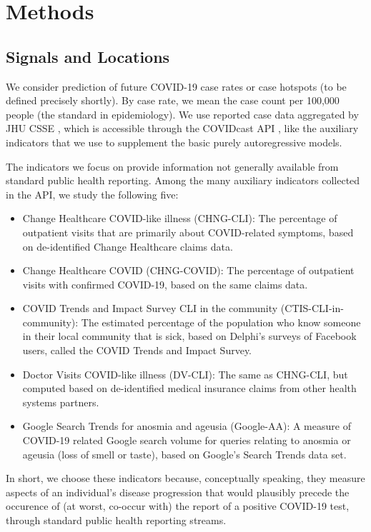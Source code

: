 \documentclass[9pt,twocolumn,twoside,lineno]{pnas-new}
\begin{document}
\section{Methods}

\subsection{Signals and Locations}

We consider prediction of future COVID-19 case rates or case hotspots (to be
defined precisely shortly).  By case rate, we mean the case count per 100,000
people (the standard in epidemiology).  We use reported case data aggregated by 
JHU CSSE \cite{Dong:2020}, which is accessible through the COVIDcast API
\cite{CovidcastAPI}, like the auxiliary indicators that we use to supplement the
basic purely autoregressive models.   

The indicators we focus on provide information not generally available from
standard public health reporting. Among the many auxiliary indicators collected
in the API, we study the following five:  
\begin{itemize}
\item Change Healthcare COVID-like illness (CHNG-CLI): The percentage of
  outpatient visits that are primarily about COVID-related symptoms, based on
  de-identified Change Healthcare claims data.
\item Change Healthcare COVID (CHNG-COVID): The percentage of outpatient visits
  with confirmed COVID-19, based on the same claims data.
\item COVID Trends and Impact Survey CLI in the community
  (CTIS-CLI-in-community): The estimated percentage of the population who know
  someone in their local community that is sick, based on Delphi's surveys of
  Facebook users, called the COVID Trends and Impact Survey. 
\item Doctor Visits COVID-like illness (DV-CLI): The same as CHNG-CLI, but
  computed based on de-identified medical insurance claims from other health
  systems partners.  
\item Google Search Trends for anosmia and ageusia (Google-AA): A measure of 
  COVID-19 related Google search volume for queries relating to anosmia or
  ageusia (loss of smell or taste), based on Google's Search Trends data set. 
\end{itemize}
In short, we choose these indicators because, conceptually speaking, they
measure aspects of an individual's disease progression that would plausibly
precede the occurence of (at worst, co-occur  with) the report of a positive
COVID-19 test, through standard public health reporting streams.
\end{document}
